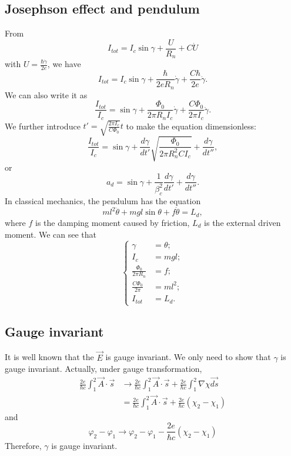 \subsection{Josephson effect and pendulum}
From
\begin{equation}
I_{tot}=I_{c}\sin\gamma+\frac{U}{R_{n}}+C\dot{U}
\end{equation}
with $U=\frac{\hbar\dot{\gamma}}{2e}$, we have 
\begin{equation}
I_{tot}=I_{c}\sin\gamma+\frac{\hbar}{2eR_{n}}\dot{\gamma}+\frac{C\hbar}{2e}\ddot{\gamma}.
\end{equation}
We can also write it as 
\begin{equation}
\frac{I_{tot}}{I_{c}}=\sin\gamma+\frac{\Phi_{0}}{2\pi R_{n}I_{c}}\dot{\gamma}+\frac{C\Phi_{0}}{2\pi I_{c}}\ddot{\gamma}.
\end{equation}
We further introduce $t'=\sqrt{\frac{2\pi I_{c}}{C\Phi_{0}}}t$ to
make the equation dimensionless:
\begin{equation}
\frac{I_{tot}}{I_{c}}=\sin\gamma+\frac{d\gamma}{dt'}\sqrt{\frac{\Phi_{0}}{2\pi R_{n}^{2}CI_{c}}}+\frac{d\gamma}{dt''},
\end{equation}
or 
\begin{equation}
a_{d}=\sin\gamma+\frac{1}{\beta_{c}^{2}}\frac{d\gamma}{dt'}+\frac{d\gamma}{dt''}.
\end{equation}
In classical mechanics, the pendulum has the equation
\begin{equation}
ml^{2}\ddot{\theta}+mgl\sin\theta+f\dot{\theta}=L_{d},
\end{equation}
where $f$ is the damping moment caused by friction, $L_{d}$ is the
external driven moment. We can see that 
\begin{equation}
\begin{cases}
\gamma & =\theta;\\
I_{c} & =mgl;\\
\frac{\Phi_{0}}{2\pi R_{n}} & =f;\\
\frac{C\Phi_{0}}{2\pi} & =ml^{2};\\
I_{tot} & =L_{d}.
\end{cases}
\end{equation}


\subsection{Gauge invariant}

It is well known that the $\overrightarrow{E}$ is gauge invariant.
We only need to show that $\gamma$ is gauge invariant. Actually,
under gauge transformation, 
\begin{align}
\frac{2e}{\hbar c}\int_{1}^{2}\overrightarrow{A}\cdot\overrightarrow{s} & \to\frac{2e}{\hbar c}\int_{1}^{2}\overrightarrow{A}\cdot\overrightarrow{s}+\frac{2e}{\hbar c}\int_{1}^{2}\nabla\chi\overrightarrow{ds}\nonumber \\
 & =\frac{2e}{\hbar c}\int_{1}^{2}\overrightarrow{A}\cdot\overrightarrow{s}+\frac{2e}{\hbar c}(\chi_{2}-\chi_{1})
\end{align}
and 
\begin{equation}
\varphi_{2}-\varphi_{1}\to\varphi_{2}-\varphi_{1}-\frac{2e}{\hbar c}(\chi_{2}-\chi_{1})
\end{equation}
Therefore, $\gamma$ is gauge invariant. 
